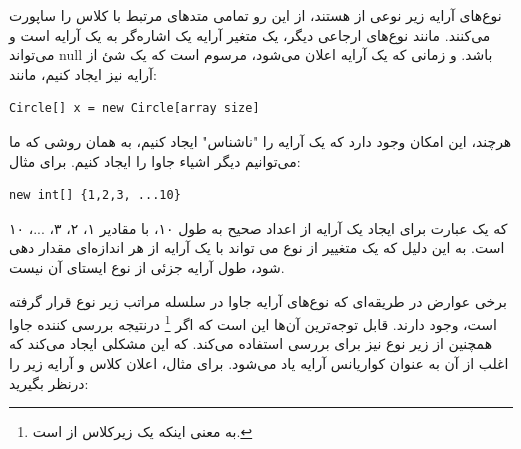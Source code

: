 \documentclass[a4paper,12pt]{report}
\newcommand{\lrm}[1]{{\color{steelBlue}\lr{\texttt{#1}}}}
\begin{document}
	نوع‌های آرایه زیر نوعی از 
	\lrm{Object} 
	هستند، از این رو تمامی متد‌های مرتبط با کلاس 
	\lrm{Object} 
	را ساپورت می‌کنند.
	مانند نوع‌های ارجاعی دیگر، یک متغیر آرایه یک اشاره‌گر به یک آرایه است و می‌تواند 
	null
	باشد. و زمانی که یک آرایه اعلان می‌شود، مرسوم است که یک شئ از آرایه نیز ایجاد کنیم، مانند:
	\begin{latin}
		\small
		\begin{lstlisting}[]
			Circle[] x = new Circle[array size]
		\end{lstlisting}
	\end{latin}	
	
	هرچند، این امکان وجود دارد که یک آرایه را "ناشناس" ایجاد کنیم، به همان روشی که ما می‌توانیم دیگر اشیاء جاوا را ایجاد کنیم. برای مثال:
	\begin{latin}
		\small
		\begin{lstlisting}[]
			new int[] {1,2,3, ...10}
		\end{lstlisting}
	\end{latin}	
	
	که یک عبارت برای ایجاد یک آرایه از اعداد صحیح به طول ۱۰، با مقادیر ۱، ۲، ۳، ...، ۱۰ است.
	به این دلیل که یک متغییر از نوع 
	\lrm{T[]}
	می تواند با یک آرایه از هر اندازه‌ای مقدار دهی شود، طول آرایه جزئی از نوع ایستای آن نیست.
	
	برخی عوارض در طریقه‌ای که نوع‌های آرایه جاوا در سلسله مراتب زیر نوع قرار گرفته است، وجود دارند.
	قابل توجه‌ترین آن‌ها این است که اگر 
	\lrm{A <: B}\footnote{
	 به معنی اینکه
	\lrm{A}
	یک زیرکلاس از 
	\lrm{B} 
	است.
	}
	درنتیجه بررسی کننده جاوا همچنین از زیر نوع 
	\lrm{A[] <: B[]}
	نیز برای بررسی استفاده می‌کند.
	که این مشکلی ایجاد می‌کند که اغلب از آن به عنوان کواریانس آرایه یاد می‌شود.
	برای مثال،‌ اعلان کلاس و آرایه زیر را درنظر بگیرید:
	
\end{document}
